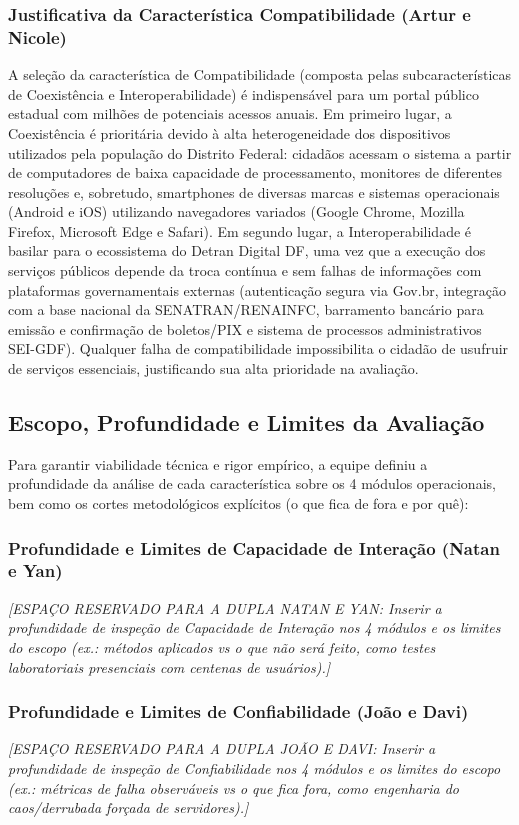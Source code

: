 \documentclass[12pt]{article}
\begin{document}
\subsubsection{Justificativa da Característica Compatibilidade (Artur e Nicole)}
A seleção da característica de Compatibilidade (composta pelas subcaracterísticas de Coexistência e Interoperabilidade) é indispensável para um portal público estadual com milhões de potenciais acessos anuais. Em primeiro lugar, a Coexistência é prioritária devido à alta heterogeneidade dos dispositivos utilizados pela população do Distrito Federal: cidadãos acessam o sistema a partir de computadores de baixa capacidade de processamento, monitores de diferentes resoluções e, sobretudo, smartphones de diversas marcas e sistemas operacionais (Android e iOS) utilizando navegadores variados (Google Chrome, Mozilla Firefox, Microsoft Edge e Safari). Em segundo lugar, a Interoperabilidade é basilar para o ecossistema do Detran Digital DF, uma vez que a execução dos serviços públicos depende da troca contínua e sem falhas de informações com plataformas governamentais externas (autenticação segura via Gov.br, integração com a base nacional da SENATRAN/RENAINFC, barramento bancário para emissão e confirmação de boletos/PIX e sistema de processos administrativos SEI-GDF). Qualquer falha de compatibilidade impossibilita o cidadão de usufruir de serviços essenciais, justificando sua alta prioridade na avaliação.

\subsection{Escopo, Profundidade e Limites da Avaliação}
Para garantir viabilidade técnica e rigor empírico, a equipe definiu a profundidade da análise de cada característica sobre os 4 módulos operacionais, bem como os cortes metodológicos explícitos (o que fica de fora e por quê):

\subsubsection{Profundidade e Limites de Capacidade de Interação (Natan e Yan)}
\textit{[ESPAÇO RESERVADO PARA A DUPLA NATAN E YAN: Inserir a profundidade de inspeção de Capacidade de Interação nos 4 módulos e os limites do escopo (ex.: métodos aplicados vs o que não será feito, como testes laboratoriais presenciais com centenas de usuários).]}

\subsubsection{Profundidade e Limites de Confiabilidade (João e Davi)}
\textit{[ESPAÇO RESERVADO PARA A DUPLA JOÃO E DAVI: Inserir a profundidade de inspeção de Confiabilidade nos 4 módulos e os limites do escopo (ex.: métricas de falha observáveis vs o que fica fora, como engenharia do caos/derrubada forçada de servidores).]}
\end{document}
